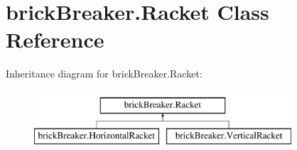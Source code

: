 \hypertarget{classbrick_breaker_1_1_racket}{
\section{brickBreaker.Racket Class Reference}
\label{classbrick_breaker_1_1_racket}
}
Inheritance diagram for brickBreaker.Racket:\begin{figure}[H]
\begin{center}
\leavevmode
\includegraphics[height=2cm]{classbrick_breaker_1_1_racket}
\end{center}
\end{figure}
